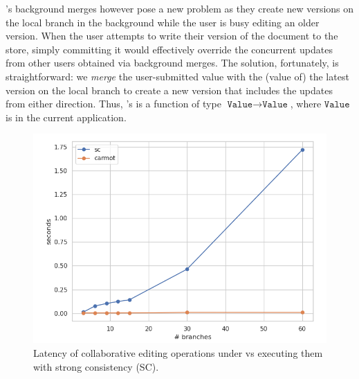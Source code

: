 \quark's background merges however pose a new problem as they create
new versions on the local branch in the background while the user is
busy editing an older version. When the user attempts to write their
version of the document to the store, simply committing it would
effectively override the concurrent updates from other users obtained
via background merges. The solution, fortunately, is straightforward:
we \emph{merge} the user-submitted value with the (value of) the
latest version on the local branch to create a new version that
includes the updates from either direction. 
Thus, \quark's  is a function of type $\texttt{Value}
\rightarrow \texttt{Value}$, where $\texttt{Value}$ is  in the
current application.

\begin{figure}[ht]
  \centering
    \includegraphics[scale=0.3]{Figures/latency}
\caption{Latency of collaborative editing operations under \quark vs
  executing them with strong consistency (SC). }
\label{fig:latency}
\end{figure}


